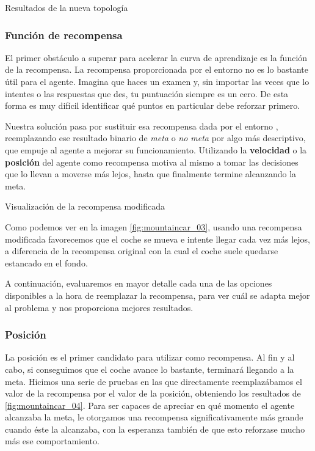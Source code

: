 %
       {Resultados de la nueva topología}


\subsubsection{Función de recompensa}

El primer obstáculo a superar para acelerar la curva de aprendizaje es la función de la recompensa. La recompensa proporcionada por el entorno no es lo bastante útil para el agente. Imagina que haces un examen y, sin importar las veces que lo intentes o las respuestas que des, tu puntuación siempre es un cero. De esta forma es muy difícil identificar qué puntos en particular debe reforzar primero.

Nuestra solución pasa por sustituir esa recompensa dada por el entorno \citep{mediumTim}, reemplazando ese resultado binario de \textit{meta} o \textit{no meta} por algo más descriptivo, que empuje al agente a mejorar su funcionamiento. Utilizando la \textbf{velocidad} o la \textbf{posición} del agente como recompensa motiva al mismo a tomar las decisiones que lo llevan a moverse más lejos, hasta que finalmente termine alcanzando la meta.

%
       {Visualización de la recompensa modificada}

Como podemos ver en la imagen \ref{fig:mountaincar_03}, usando una recompensa modificada favorecemos que el coche se mueva e intente llegar cada vez más lejos, a diferencia de la recompensa original con la cual el coche suele quedarse estancado en el fondo.

A continuación, evaluaremos en mayor detalle cada una de las opciones disponibles a la hora de reemplazar la recompensa, para ver cuál se adapta mejor al problema y nos proporciona mejores resultados.


\subsubsection*{Posición}

La posición es el primer candidato para utilizar como recompensa. Al fin y al cabo, si conseguimos que el coche avance lo bastante, terminará llegando a la meta. Hicimos una serie de pruebas en las que directamente reemplazábamos el valor de la recompensa por el valor de la posición, obteniendo los resultados de \ref{fig:mountaincar_04}. Para ser capaces de apreciar en qué momento el agente alcanzaba la meta, le otorgamos una recompensa significativamente más grande cuando éste la alcanzaba, con la esperanza también de que esto reforzase mucho más ese comportamiento.

